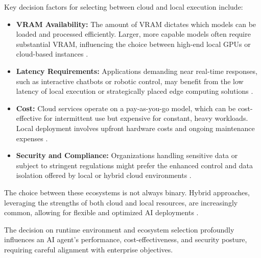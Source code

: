Key decision factors for selecting between cloud and local execution include:

\begin{itemize}
  \item \textbf{VRAM Availability:} The amount of VRAM dictates which models can be loaded and processed efficiently. Larger, more capable models often require substantial VRAM, influencing the choice between high-end local GPUs or cloud-based instances \cite{Reger2026}.
  \item \textbf{Latency Requirements:} Applications demanding near real-time responses, such as interactive chatbots or robotic control, may benefit from the low latency of local execution or strategically placed edge computing solutions \cite{Gartner2025}.
  \item \textbf{Cost:} Cloud services operate on a pay-as-you-go model, which can be cost-effective for intermittent use but expensive for constant, heavy workloads. Local deployment involves upfront hardware costs and ongoing maintenance expenses \cite{Reger2026}.
  \item \textbf{Security and Compliance:} Organizations handling sensitive data or subject to stringent regulations might prefer the enhanced control and data isolation offered by local or hybrid cloud environments \cite{Gartner2025}.
\end{itemize}

The choice between these ecosystems is not always binary. Hybrid approaches, leveraging the strengths of both cloud and local resources, are increasingly common, allowing for flexible and optimized AI deployments \cite{Reger2026}.

The decision on runtime environment and ecosystem selection profoundly influences an AI agent's performance, cost-effectiveness, and security posture, requiring careful alignment with enterprise objectives.
